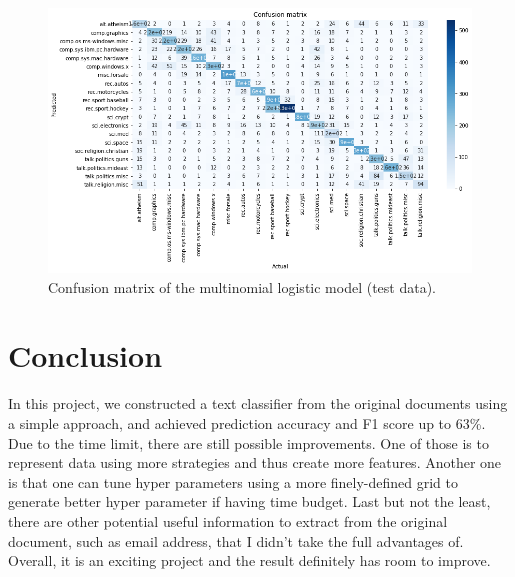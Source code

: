 \documentclass[11pt]{article}
\theoremstyle{remark}
\begin{document}
\begin{figure}[t]
 \begin{center}
	\includegraphics[width=15cm]{figs/fig4-confusion-matrix.png}
 \end{center}
  \caption{Confusion matrix of the multinomial logistic model (test data).}
  \label{fig:conf-mat}
\end{figure}
 
\section{Conclusion}

In this project, we constructed a text classifier from the original documents using a simple approach, and achieved prediction accuracy and F1 score up to 63\%. %
Due to the time limit, there are still possible improvements. One of those is to represent data using more strategies and thus create more features. Another one is that one can tune hyper parameters using a more finely-defined grid to generate better hyper parameter if having time budget. Last but not the least, there are other potential useful information to extract from the original document, such as email address, that I didn't take the full advantages of. Overall, it is an exciting project and the result definitely has room to improve. 

% 
%
% 
\end{document}
